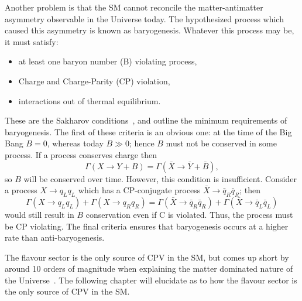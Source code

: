 Another problem is that the SM cannot reconcile the matter-antimatter asymmetry observable in the
Universe today.
The hypothesized process which caused this asymmetry is known as baryogenesis.
Whatever this process may be, it must satisfy:
\begin{itemize}
  \item at least one baryon number (B) violating process,
  \item Charge and Charge-Parity (CP) violation,
  \item interactions out of thermal equilibrium.
\end{itemize}
These are the Sakharov conditions~\cite{1991SvPhU..34..392S}, and outline the minimum requirements
of baryogenesis.
The first of these criteria is an obvious one: at the time of the Big Bang $B=0$, whereas today
$B\gg0$; hence $B$ must not be conserved in some process.
If a process conserves charge then
\begin{equation}
  \Gamma(X\to Y+B)=\Gamma(\bar X \to \bar Y+\bar B),
\end{equation}
so $B$ will be conserved over time.
However, this condition is insufficient.
Consider a process $X\to q_Lq_L$ which has a CP-conjugate process $\bar X\to \bar q_R\bar q_R$;
then
\begin{equation}
  \Gamma(X\to q_Lq_L) + \Gamma(X\to q_Rq_R)
  =
  \Gamma(\bar X\to \bar q_R\bar q_R) + \Gamma(\bar X\to \bar q_L\bar q_L)
\end{equation}
would still result in $B$ conservation even if C is violated.
Thus, the process must be CP violating.
The final criteria ensures that baryogenesis occurs at a higher rate than anti-baryogenesis.

The flavour sector is the only source of CPV in the SM, but comes up short by around 10 orders of
magnitude when explaining the matter dominated nature of the Universe~\cite{Cline:2006ts,Huet:1994jb}.
The following chapter will elucidate as to how the flavour sector is the only source of CPV in the
SM.



